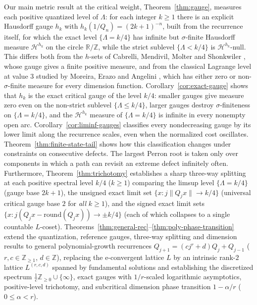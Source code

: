 \documentclass[11pt]{article}
\theoremstyle{definition}
\theoremstyle{remark}
\newcommand{\R}{\mathbb{R}}
\newcommand{\Z}{\mathbb{Z}}
\newcommand{\ee}{\mathrm{e}}
\newcommand{\Lam}{\Lambda}
\begin{document}
Our main metric result at the critical weight, Theorem~\ref{thm:gauge},
measures each positive quantized level of $\Lam$: for each integer $k\ge1$
there is an explicit Hausdorff gauge $h_k$ with $h_k(1/Q_n)=(2k+1)^{-n}$, built
from the recurrence itself, for which the exact level $\{\Lam=k/4\}$ has
infinite but $\sigma$-finite Hausdorff measure $\mathcal H^{h_k}$ on the circle
$\R/\Z$, while the strict sublevel $\{\Lam<k/4\}$ is $\mathcal H^{h_k}$-null.
This differs both from the $h$-sets of Cabrelli, Mendivil, Molter and
Shonkwiler \cite[\S5, Theorem~3]{CMMS}, whose gauge gives a finite positive
measure, and from the classical Lagrange level at value $3$ studied by Moreira,
Erazo and Angelini \cite{MEA}, which has either zero or non-$\sigma$-finite
measure for every dimension function. Corollary~\ref{cor:exact-gauge} shows
that $h_k$ is the exact critical gauge of the level $k/4$: smaller gauges give
measure zero even on the non-strict sublevel $\{\Lam\le k/4\}$, larger gauges
destroy $\sigma$-finiteness on $\{\Lam=k/4\}$, and the $\mathcal H^{h_k}$
measure of $\{\Lam=k/4\}$ is infinite in every nonempty open arc.
Corollary~\ref{cor:liminf-gauges} classifies every nondecreasing gauge by
its lower limit along the recurrence scales, even when the normalized
cost oscillates. Theorem~\ref{thm:finite-state-tail} shows how this
classification changes under constraints on consecutive defects.
The largest Perron root is taken only over components in which a path
can revisit an extreme defect infinitely often.
Furthermore, Theorem~\ref{thm:trichotomy} establishes a sharp three-way
splitting at each positive spectral level $k/4$ ($k\ge1$) comparing the limsup
level $\{\Lam=k/4\}$ (gauge base $2k+1$), the unsigned exact limit set
$\{x:j\|Q_jx\|\to k/4\}$ (universal critical gauge base $2$ for \emph{all}
$k\ge1$), and the signed exact limit sets
$\{x:j(Q_jx-\mathrm{round}(Q_jx))\to\pm k/4\}$ (each of which collapses to a
single countable $L$-coset). Theorems~\ref{thm:general-rec}--\ref{thm:poly-phase-transition}
extend the quantization, reference gauges, three-way splitting and
dimension results to general polynomial-growth recurrences
$Q_{j+1}=(cj^r+d)Q_j+Q_{j-1}$ ($r,c\in\Z_{\ge1}$, $d\in\Z$), replacing the
$\ee$-convergent lattice $L$ by an intrinsic rank-$2$ lattice $L^{(r,c,d)}$
spanned by fundamental solutions and establishing the discretized spectrum
$\frac1c\Z_{\ge0}\cup\{\infty\}$, exact gauges with $1/r$-scaled logarithmic
asymptotics, positive-level trichotomy, and subcritical dimension phase
transition $1-\alpha/r$ ($0\le\alpha<r$).
\end{document}
